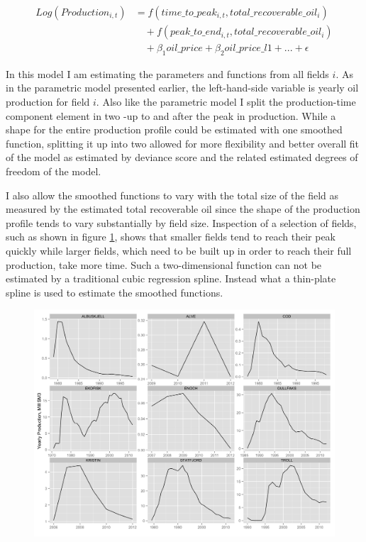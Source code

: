 \documentclass[12pt]{scrartcl} %
\begin{document}
\begin{equation}
\begin{split}
	Log(Production_{i,t})&=f(time\_to\_peak_{i,t}, total\_recoverable\_oil_i) \\
	& \quad + f(peak\_to\_end_{i,t}, total\_recoverable\_oil_i) \\
	& \quad + \beta_1 oil\_price + \beta_2 oil\_price\_l1 + ... +  \epsilon
\end{split}
\label{gam_price_eqn}
\end{equation}

In this model I am estimating the parameters and functions from all fields $i$. As in the parametric model presented earlier, the left-hand-side variable is yearly oil production for field $i$. Also like the parametric model I split the production-time component element in two -up to and after the peak in production.  While a shape for the entire production profile could be estimated with one smoothed function, splitting it up into two allowed for more flexibility and better overall fit of the model as estimated by deviance score and the related estimated degrees of freedom of the model.  

 I also allow the smoothed functions to vary with the total size of the field as measured by the estimated total recoverable oil since the shape of the production profile tends to vary substantially by field size.  Inspection of a selection of fields, such as shown in figure \ref{field_inspection}, shows that smaller fields tend to reach their peak quickly while larger fields, which need to be built up in order to reach their full production, take more time.   Such a two-dimensional function can not be estimated by a traditional cubic regression spline.  Instead what a thin-plate spline \citep[p.150]{wood_generalized_2006} is used to estimate the smoothed functions.

\begin{figure}
	\includegraphics[width=.8\textwidth]{field_inspection.png}
	\caption{}
	\label{field_inspection}
\end{figure}
\end{document}
